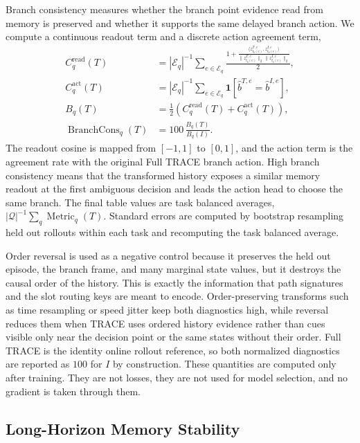 \documentclass{article}
\begin{document}
Branch consistency measures whether the branch point evidence read from memory is preserved and whether it supports the same delayed branch action. We compute a continuous readout term and a discrete action agreement term,
\begin{align}
    C_q^{\mathrm{read}}(T)
    &=
    |\mathcal{E}_q|^{-1}
    \sum_{e\in\mathcal{E}_q}
    \frac{1+
    \frac{
    \langle z_{t_b(e)}^{T,e},z_{t_b(e)}^{I,e}\rangle
    }{
    \|z_{t_b(e)}^{T,e}\|_2\,
    \|z_{t_b(e)}^{I,e}\|_2
    }}{2},
    \\
    C_q^{\mathrm{act}}(T)
    &=
    |\mathcal{E}_q|^{-1}
    \sum_{e\in\mathcal{E}_q}
    \mathbf{1}\!\left[\hat b^{T,e}=\hat b^{I,e}\right],
    \\
    B_q(T)
    &=
    \frac{1}{2}
    \left(
    C_q^{\mathrm{read}}(T)+C_q^{\mathrm{act}}(T)
    \right),
    \\
    \operatorname{BranchCons}_q(T)
    &=
    100\,
    \frac{B_q(T)}{B_q(I)}.
    \label{eq:branch_norm}
\end{align}
The readout cosine is mapped from $[-1,1]$ to $[0,1]$, and the action term is the agreement rate with the original Full TRACE branch action. High branch consistency means that the transformed history exposes a similar memory readout at the first ambiguous decision and leads the action head to choose the same branch. The final table values are task balanced averages, $|\mathcal{Q}|^{-1}\sum_q\operatorname{Metric}_q(T)$. Standard errors are computed by bootstrap resampling held out rollouts within each task and recomputing the task balanced average.

Order reversal is used as a negative control because it preserves the held out episode, the branch frame, and many marginal state values, but it destroys the causal order of the history. This is exactly the information that path signatures and the slot routing keys are meant to encode. Order-preserving transforms such as time resampling or speed jitter keep both diagnostics high, while reversal reduces them when TRACE uses ordered history evidence rather than cues visible only near the decision point or the same states without their order. Full TRACE is the identity online rollout reference, so both normalized diagnostics are reported as $100$ for $I$ by construction. These quantities are computed only after training. They are not losses, they are not used for model selection, and no gradient is taken through them.

\subsection{Long-Horizon Memory Stability}
\label{app:stability}
\end{document}
